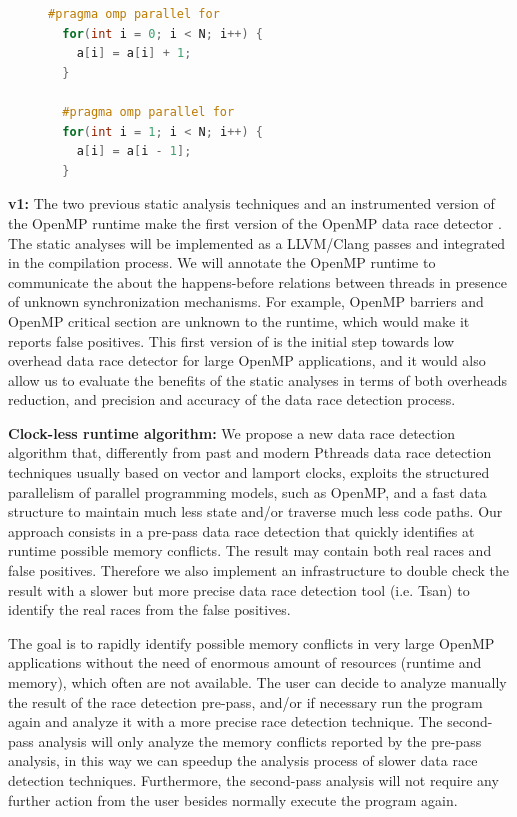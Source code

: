 \begin{figure}
  \vspace{-2ex}
  \begin{lstlisting}[language=C++, caption=OpenMP loops with and without loop-carried data dependency., label=code:example01]
  #pragma omp parallel for
  for(int i = 0; i < N; i++) {
    a[i] = a[i] + 1;
  }

  #pragma omp parallel for
  for(int i = 1; i < N; i++) {
    a[i] = a[i - 1];
  }
  \end{lstlisting}
\end{figure}

\textbf{\archer v1:} The two previous static analysis techniques and an
instrumented version of the OpenMP runtime make the first version of the
OpenMP data race detector \archer.
%
The static analyses will be implemented as a LLVM/Clang passes and integrated
in the compilation process.
%
We will annotate the OpenMP runtime to communicate the \tsan about the
happens-before relations between threads in presence of unknown
synchronization mechanisms.
%
For example, OpenMP barriers and OpenMP critical section are unknown to the
\tsan runtime, which would make it reports false positives.
%
This first version of \archer is the initial step towards low overhead data
race detector for large OpenMP applications, and it would also allow us to
evaluate the benefits of the static analyses in terms of both overheads
reduction, and precision and accuracy of the data race detection process.

\textbf{Clock-less runtime algorithm:} We propose a new data race detection
algorithm that, differently from past and modern Pthreads data race detection
techniques usually based on vector and lamport clocks, exploits the structured
parallelism of parallel programming models, such as OpenMP, and a fast data
structure to maintain much less state and/or traverse much less code paths.
%
Our approach consists in a pre-pass data race detection that quickly
identifies at runtime possible memory conflicts.
%
The result may contain both real races and false positives.
%
Therefore we also implement an infrastructure to double check the result with
a slower but more precise data race detection tool (i.e. Tsan) to identify the
real races from the false positives.

The goal is to rapidly identify possible memory conflicts in very large OpenMP
applications without the need of enormous amount of resources (runtime and
memory), which often are not available.
%
The user can decide to analyze manually the result of the race detection
pre-pass, and/or if necessary run the program again and analyze it with a more
precise race detection technique.
%
The second-pass analysis will only analyze the memory conflicts reported by
the pre-pass analysis, in this way we can speedup the analysis process of
slower data race detection techniques.
%
Furthermore, the second-pass analysis will not require any further action from
the user besides normally execute the program again.

